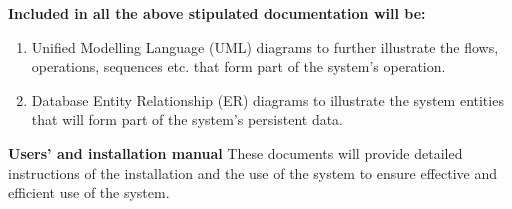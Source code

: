 \textbf{Included in all the above stipulated documentation will be:}
\begin{enumerate}
\item Unified Modelling Language (UML) diagrams to further illustrate the
flows, operations, sequences etc. that form part of the system's
operation.
\item Database Entity Relationship (ER) diagrams to illustrate the system entities that will form part of the system's persistent data.
\end{enumerate}

\textbf{Users’ and installation manual}
\newline
These documents will provide detailed instructions of the installation and the
use of the system to ensure effective and efficient use of the system.
